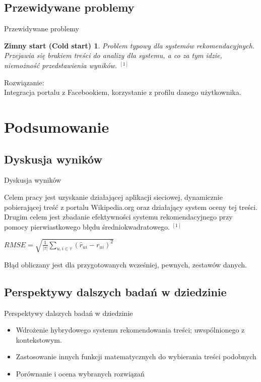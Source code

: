 \documentclass{beamer}
\begin{document}
\subsection{Przewidywane problemy}
\begin{frame}{Przewidywane problemy} 
\newtheorem{mydef3}{Zimny start (Cold start)}
\begin{mydef3}
Problem typowy dla systemów rekomendacyjnych. Przejawia się brakiem treści do analizy dla systemu, a co za tym idzie, niemożność przedstawienia wyników. $ ^{[1]} $
\end{mydef3}

Rozwiązanie:\\
Integracja portalu z Facebookiem, korzystanie z profilu danego użytkownika.

\end{frame}


\section{Podsumowanie}

\subsection{Dyskusja wyników}
\begin{frame}{Dyskusja wyników} 

Celem pracy jest uzyskanie działającej aplikacji sieciowej, dynamicznie pobierającej treść z portalu Wikipedia.org oraz działający system oceny tej treści.\\
Drugim celem jest zbadanie efektywności systemu rekomendacyjnego przy pomocy pierwiastkowego błędu średniokwadratowego.  $ ^{[1]} $ \\

\begin{center}$ RMSE = \sqrt{ \frac{1}{|\tau|} \displaystyle\sum\limits_{u,i \in  \tau } (\hat{r}_{ui}- r_{ui})^2}$ \end{center} 

Błąd obliczany jest dla przygotowanych wcześniej, pewnych, zestawów danych.

\end{frame}


\subsection{Perspektywy dalszych badań w dziedzinie}
\begin{frame}{Perspektywy dalszych badań w dziedzinie} 

\begin{itemize}
\item Wdrożenie hybrydowego systemu rekomendowania treści; uwspólnionego z kontekstowym.
\item Zastosowanie innych funkcji matematycznych do wybierania treści podobnych
\item Porównanie i ocena wybranych rozwiązań
\end{itemize}

\end{frame}
\end{document}
